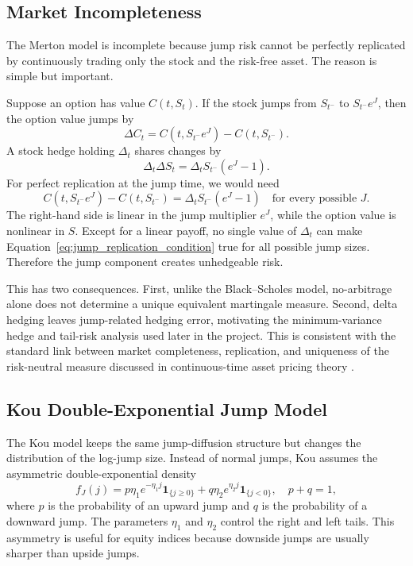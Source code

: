 \documentclass[12pt]{article}
\begin{document}
\subsection*{Market Incompleteness}

The Merton model is incomplete because jump risk cannot be perfectly replicated by continuously trading only the stock and the risk-free asset. The reason is simple but important.

Suppose an option has value $C(t,S_t)$. If the stock jumps from $S_{t^-}$ to $S_{t^-}e^J$, then the option value jumps by
\begin{equation}
\Delta C_t=C(t,S_{t^-}e^J)-C(t,S_{t^-}).
\label{eq:option_jump}
\end{equation}
A stock hedge holding $\Delta_t$ shares changes by
\begin{equation}
\Delta_t\Delta S_t=\Delta_t S_{t^-}(e^J-1).
\label{eq:stock_jump_hedge}
\end{equation}
For perfect replication at the jump time, we would need
\begin{equation}
C(t,S_{t^-}e^J)-C(t,S_{t^-})
=\Delta_tS_{t^-}(e^J-1)
\quad\text{for every possible }J.
\label{eq:jump_replication_condition}
\end{equation}
The right-hand side is linear in the jump multiplier $e^J$, while the option value is nonlinear in $S$. Except for a linear payoff, no single value of $\Delta_t$ can make Equation~\eqref{eq:jump_replication_condition} true for all possible jump sizes. Therefore the jump component creates unhedgeable risk.

This has two consequences. First, unlike the Black--Scholes model, no-arbitrage alone does not determine a unique equivalent martingale measure. Second, delta hedging leaves jump-related hedging error, motivating the minimum-variance hedge and tail-risk analysis used later in the project. This is consistent with the standard link between market completeness, replication, and uniqueness of the risk-neutral measure discussed in continuous-time asset pricing theory \citep{Shreve2004}.

\subsection*{Kou Double-Exponential Jump Model}

The Kou model keeps the same jump-diffusion structure but changes the distribution of the log-jump size. Instead of normal jumps, Kou assumes the asymmetric double-exponential density
\begin{equation}
f_J(j)=p\eta_1e^{-\eta_1 j}\mathbf{1}_{\{j\geq 0\}}
+q\eta_2e^{\eta_2 j}\mathbf{1}_{\{j<0\}},
\quad p+q=1,
\label{eq:kou_density}
\end{equation}
where $p$ is the probability of an upward jump and $q$ is the probability of a downward jump. The parameters $\eta_1$ and $\eta_2$ control the right and left tails. This asymmetry is useful for equity indices because downside jumps are usually sharper than upside jumps.
\end{document}
